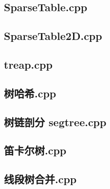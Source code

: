 \subsection{SparseTable.cpp}


\subsection{SparseTable2D.cpp}


\subsection{treap.cpp}


\subsection{树哈希.cpp}


\subsection{树链剖分 segtree.cpp}


\subsection{笛卡尔树.cpp}


\subsection{线段树合并.cpp}


